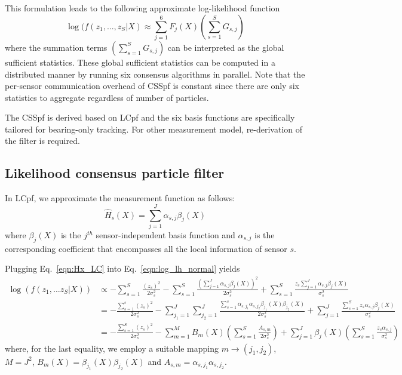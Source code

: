 \documentclass[10pt,letterpaper,final]{article}
\begin{document}
This formulation leads to the following approximate log-likelihood function
\begin{equation}
\log(f(z_1,..., z_S|X) \approx \sum_{j=1}^6 F_j(X) \left(\sum_{s=1}^S G_{s,j}\right)
\label{eqn:llh_css}
\end{equation}
where the summation terms $\left(\sum_{s=1}^S G_{s,j}\right)$ can be interpreted as the global sufficient statistics. These global sufficient statistics can be computed in a distributed manner by running six consensus algorithms in parallel. Note that the per-sensor communication overhead of CSSpf is constant since there are only six statistics to aggregate regardless of number of particles. 

The CSSpf is derived based on LCpf and the six basis functions are specifically tailored for bearing-only tracking. For other measurement model, re-derivation of the filter is required. 

\subsection{Likelihood consensus particle filter}
In LCpf, we approximate the measurement function as follows:
\begin{equation}
\hat{H}_s(X) = \sum_{j=1}^J \alpha_{s,j} \beta_j(X)
\label{eqn:Hx_LC}
\end{equation}
where $\beta_j(X)$ is the $j^{th}$ sensor-independent basis function and $\alpha_{s,j}$ is the corresponding coefficient that encompasses all the local information of sensor $s$. 

Plugging Eq.~\eqref{eqn:Hx_LC} into Eq.~\eqref{eqn:log_lh_normal} yields
\begin{align}
\log(f(z_1,...z_S|X)) &\propto -\sum_{s=1}^S \frac{(z_s)^2}{2\sigma_s^2} -\sum_{s=1}^S \frac{\left( \sum_{j=1}^J \alpha_{s,j} \beta_j(X)\right)^2}{2\sigma_s^2} + \sum_{s=1}^S \frac{z_s\sum_{j=1}^J \alpha_{s,j} \beta_j(X)}{\sigma_s^2} \nonumber \\
&= -\frac{\sum_{s=1}^s(z_s)^2}{2\sigma_s^2} - \sum_{j_1=1}^J\sum_{j_2=1}^J\frac{\sum_{s=1}^s \alpha_{s,j_1}\alpha_{s,j_2} \beta_{j_1}(X)\beta_{j_2}(X)}{2\sigma_s^2}+ \sum_{j=1}^J\frac{\sum_{s=1}^S z_s \alpha_{s,j} \beta_j(X)}{\sigma_s^2} \nonumber \\
&= -\frac{\sum_{s=1}^S(z_s)^2}{2\sigma_s^2} - \sum_{m=1}^MB_{m}(X)\left(\sum_{s=1}^S\frac{A_{s,m} }{2\sigma_s^2}\right)+ \sum_{j=1}^J\beta_j(X)\left(\sum_{s=1}^S\frac{z_s \alpha_{s,j} }{\sigma_s^2}\right)
\label{eqn:joint_log_lh_LC}
\end{align}
where, for the last equality, we employ a suitable mapping $m\rightarrow (j_1,j_2)$, $M=J^2$, $B_m(X)=\beta_{j_1}(X)\beta_{j_2}(X)$ and $A_{s,m} = \alpha_{s,j_1}\alpha_{s,j_2}$. 
\end{document}
